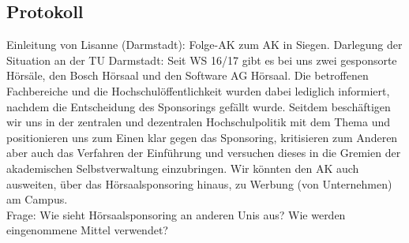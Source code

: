   \subsection*{Protokoll}
	 	Einleitung von Lisanne (Darmstadt): Folge-AK zum AK in Siegen. Darlegung der Situation an der TU Darmstadt: Seit WS 16/17 gibt es bei uns zwei gesponsorte Hörsäle, den Bosch Hörsaal und den Software AG Hörsaal. Die betroffenen Fachbereiche und die Hochschulöffentlichkeit wurden dabei lediglich informiert, nachdem die Entscheidung des Sponsorings gefällt wurde. Seitdem beschäftigen wir uns in der zentralen und dezentralen Hochschulpolitik mit dem Thema und positionieren uns zum Einen klar gegen das Sponsoring, kritisieren zum Anderen aber auch das Verfahren der Einführung und versuchen dieses in die Gremien der akademischen Selbstverwaltung einzubringen.
		Wir könnten den AK auch ausweiten, über das Hörsaalsponsoring hinaus, zu Werbung (von Unternehmen) am Campus. \\
		Frage: Wie sieht Hörsaalsponsoring an anderen Unis aus? Wie werden eingenommene Mittel verwendet?

